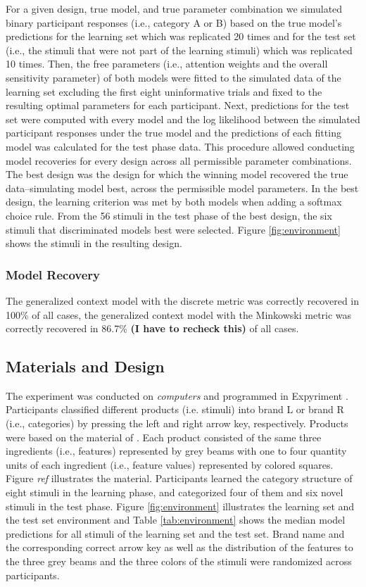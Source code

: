 \documentclass[a4paper,man,natbib]{apa6}
\newcommand{\cmmnt}[1]{\ignorespaces}
\begin{document}
For a given design, true model, and true parameter combination we simulated binary participant responses (i.e., category A or B) based on the true model's predictions for the learning set which was replicated 20 times and for the test set (i.e., the stimuli that were not part of the learning stimuli) which was replicated 10 times. Then, the free parameters (i.e., attention weights and the overall sensitivity parameter) of both models were fitted to the simulated data of the learning set excluding the first eight uninformative trials\cmmnt{ where models have not encountered enough instances to render informative predictions} and fixed to the resulting optimal parameters for each participant. Next, predictions for the test set were computed with every model and the log likelihood between the simulated participant responses under the true model and the predictions of each fitting model was calculated for the test phase data. This procedure allowed conducting model recoveries for every design across all permissible parameter combinations. The best design was the design for which the winning model recovered the true data--simulating model best, across the permissible model parameters. In the best design, the learning criterion was met by both models when adding a softmax choice rule. From the 56 stimuli in the test phase of the best design, the six stimuli that discriminated models best were selected. Figure \ref{fig:environment} shows the stimuli in the resulting design.

\subsubsection{Model Recovery}
The generalized context model with the discrete metric was correctly recovered in 100\% of all cases, the generalized context model with the Minkowski metric was correctly recovered in 86.7\% \textbf{(I have to recheck this)} of all cases. 

\subsection{Materials and Design}
The experiment was conducted on \textit{computers} and programmed in Expyriment \citep{krause2014expyriment}.  Participants classified different products (i.e. stimuli) into brand L or brand R (i.e., categories) by pressing the left and right arrow key, respectively. Products were based on the material of \cite{albrechtxxxunstacking}. Each product consisted of the same three ingredients (i.e., features) represented by grey beams with one to four quantity units of each ingredient (i.e., feature values) represented by colored squares. Figure \textit{ref} illustrates the material. Participants learned the category structure of eight stimuli in the learning phase, and categorized four of them and six novel stimuli in the test phase. Figure \ref{fig:environment} illustrates the learning set and the test set environment and Table \ref{tab:environment} shows the median model predictions for all stimuli of the learning set and the test set. Brand name and the corresponding correct arrow key as well as the distribution of the features to the three grey beams and the three colors of the stimuli were randomized across participants.
\end{document}
